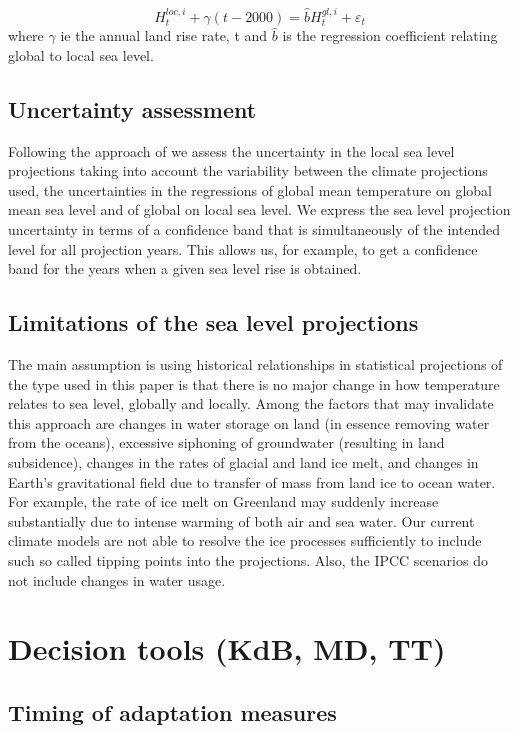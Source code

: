 \documentclass[draft,linenumbers]{agujournal}
\begin{document}
\[H_t^{loc,i} + \gamma (t -2000 ) = {\hat b} H_t^{gl,i}  + {\varepsilon _t}\]
where $\gamma$ ie the annual land rise rate, t and $ {\hat b} $ is the regression coefficient relating global to local sea level.



\subsection{Uncertainty assessment}
\label{unc_ass}
Following the approach of \citet{Guttorp2014} we assess the uncertainty in the local sea level projections taking into account the variability between the climate projections used, the uncertainties in the regressions of global mean temperature on global mean sea level and of global on local sea level. We express the sea level projection uncertainty in terms of a confidence band that is simultaneously of the intended  level  for all projection years. This allows us, for example, to get a confidence band for the years when a given sea level rise is obtained. 



\subsection{Limitations of the sea level projections}
The main assumption is using historical relationships in statistical projections of the type used in this paper is that there is no major change in how temperature relates to sea level, globally and locally. Among the factors that may invalidate this approach are changes in water storage on land (in essence removing water from the oceans), excessive siphoning of groundwater (resulting in land subsidence), changes in the rates of glacial and land ice melt, and changes in Earth's gravitational field due to transfer of mass from land ice to ocean water. For example, the rate of ice melt on Greenland may suddenly increase substantially due to intense warming of both air and sea water. Our current climate models are not able to resolve the ice processes sufficiently to include such so called tipping points into the projections. Also, the IPCC scenarios \citep{change} do not include changes in water usage.

\section{Decision tools {\color{blue} (KdB, MD, TT)}}
\label{decision_tools}

\subsection{Timing of adaptation measures}
\end{document}
